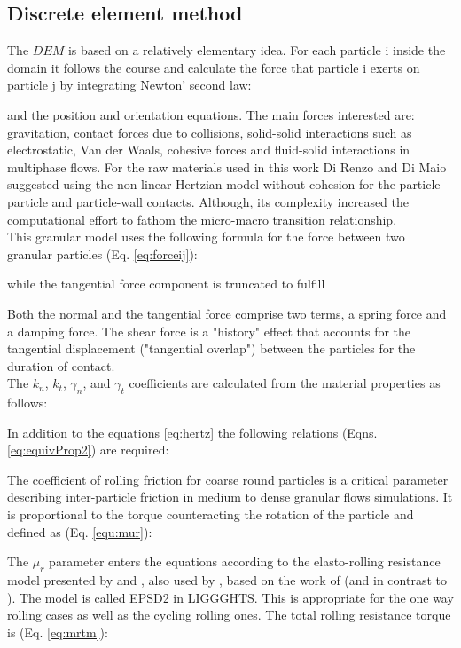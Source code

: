 \subsection{Discrete element method}
\label{subsec:dem}
The $DEM$ is based on a relatively elementary idea. For each particle i inside
the domain it follows the course and calculate the force that particle i exerts on particle j
by integrating Newton' second law:

 
and the position and orientation equations.
The main forces interested are: gravitation, contact forces due to collisions,
solid-solid interactions such as electrostatic, Van der Waals, cohesive forces
and fluid-solid interactions in multiphase flows.
For the raw materials used in this work Di Renzo and Di Maio \cite{RefWorks:145}
suggested using the non-linear Hertzian model without cohesion for the particle-particle and particle-wall contacts.
Although, its complexity increased the computational effort to fathom the
micro-macro transition relationship.\\
This granular model uses the following formula for the force between two granular particles (Eq. \ref{eq:forceij}):

while the tangential force component is truncated to fulfill

Both the normal and the tangential force comprise two terms, a spring force and a damping force. The shear force is a "history" effect that accounts for the tangential displacement 
("tangential overlap") between the particles for the duration of contact. \\

The $k_n$, $k_t$, $\gamma_n$, and $\gamma_t$ coefficients are calculated from the material properties as follows:

In addition to the equations \ref{eq:hertz} the following relations (Eqns. \ref{eq:equivProp2}) are required:

The coefficient of rolling friction for coarse round particles is a critical
parameter describing inter-particle friction in medium to dense granular flows simulations.
It is proportional to the torque counteracting the rotation of the particle and defined as (Eq. \ref{equ:mur}):

The $\mu_r$ parameter enters the equations according to the elasto-rolling
resistance model presented by \cite{RefWorks:87} and \cite{RefWorks:131}, also
used by \cite{RefWorks:173}, based on the work of
\cite{RefWorks:143}(and in contrast to \cite{RefWorks:144}). The model is called EPSD2 in LIGGGHTS.
This is appropriate for the one way rolling cases as well as the cycling rolling ones.
The total rolling resistance torque is (Eq. \ref{eq:mrtm}):


